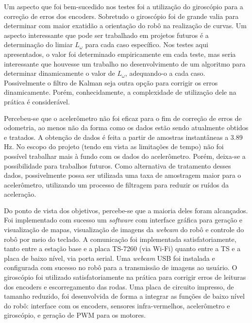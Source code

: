 Um aspecto que foi bem-sucedido nos testes foi a utilização do giroscópio para a correção de erros dos encoders. Sobretudo o giroscópio foi de grande valia para determinar com maior exatidão a orientação do robô na realização de curvas. Um aspecto interessante que pode ser trabalhado em projetos futuros é a determinação do limiar $L_\omega$ para cada caso específico. Nos testes aqui apresentados, o valor foi determinado empiricamente em cada teste, mas seria interessante que houvesse um trabalho no desenvolvimento de um algoritmo para determinar dinamicamente o valor de $L_\omega$, adequando-o a cada caso. Possivelmente o filtro de Kalman seja outra opção para corrigir os erros dinamicamente. Porém, conhecidamente, a complexidade de utilização dele na prática é considerável.

Percebeu-se que o acelerômetro não foi eficaz para o fim de correção de erros de odometria, ao menos não da forma como os dados estão sendo atualmente obtidos e tratados. A obtenção de dados é feita a partir de amostras instantâneas a 3.89 Hz. No escopo do projeto (tendo em vista as limitações de tempo) não foi possível trabalhar mais à fundo com os dados do acelerômetro. Porém, deixa-se a possibilidade para trabalhos futuros. Como alternativa de tratamento desses dados, possivelmente possa ser utilizada uma taxa de amostragem maior para o acelerômetro, utilizando um processo de filtragem para reduzir os ruídos da aceleração.

Do ponto de vista dos objetivos, percebe-se que a maioria deles foram alcançados. Foi implementado com sucesso um \textit{software} com interface gráfica para geração e visualização de mapas, visualização de imagens da \textit{webcam} do robô e controle do robô por meio do teclado. A comunicação foi implementada satisfatoriamente, tanto entre a estação base e a placa TS-7260 (via Wi-Fi) quanto entre a TS e a placa de baixo nível, via porta serial. Uma \textit{webcam} USB foi instalada e configurada com sucesso no robô para a transmissão de imagens ao usuário. O giroscópio foi utilizado satisfatoriamente na prática para corrigir erros de leituras dos encoders e escorregamento das rodas. Uma placa de circuito impresso, de tamanho reduzido, foi desenvolvida de forma a integrar as funções de baixo nível do robô: interface com os encoders, sensores infra-vermelhos, acelerômetro e giroscópio, e geração de PWM para os motores.

